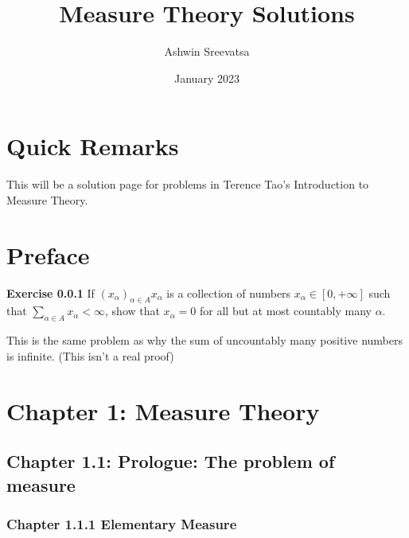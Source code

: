 \documentclass[answers,12pt]{exam}
\title{Measure Theory Solutions}
\author{Ashwin Sreevatsa}
\date{January 2023}
\begin{document}
\maketitle
\setcounter{section}{-1}

\section*{Quick Remarks}
This will be a solution page for problems in Terence Tao's Introduction to Measure Theory.

\section{Preface}

\textbf{Exercise 0.0.1} If $(x_{\alpha})_{\alpha \in A} x_{\alpha}$
 is a collection of numbers $x_{\alpha} \in [0, +\infty]$
 such that $\sum_{\alpha \in A}x_{\alpha}< \infty$,
 show that $x_{\alpha}=0$ for all
 but at most countably many $\alpha$.
 \begin{solution}
     This is the same problem as why the sum of uncountably many positive numbers is infinite. (This isn't a real proof)
 \end{solution}

\section{Chapter 1: Measure Theory}

\subsection{Chapter 1.1: Prologue: The problem of measure}

\subsubsection{Chapter 1.1.1 Elementary Measure}
\end{document}
